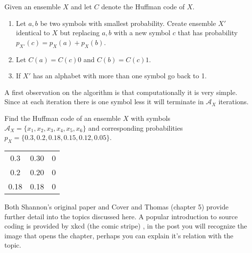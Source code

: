 Given an ensemble $X$ and let $C$ denote the Huffman code of $X$.
\begin{enumerate}
\item Let $a,b$ be two symbols with smallest probability. Create ensemble $X'$ identical to $X$ but replacing $a,b$ with a new symbol $c$ that has probability $p_{X'}(c)=p_X(a)+p_X(b)$. 
\item Let $C(a)=C(c)0$ and $C(b)=C(c)1$.
\item If $X'$ has an alphabet with more than one symbol go back to 1.
\end{enumerate}
A first observation on the algorithm is that computationally it is very simple. Since at each iteration there is one symbol less it will terminate in $\mathcal A_X$ iterations.
\begin{exercise}
Find the Huffman code of an ensemble $X$ with symbols $\mathcal A_X=\{x_1,x_2,x_3,x_4,x_5,x_6\}$ and corresponding probabilities $p_X=\{0.3,0.2,0.18,0.15,0.12,0.05\}$.
\end{exercise}
\begin{solution}

\begin{table}[h!]
  \begin{center}
    \label{tab:table1}
    \begin{tabular}{ccc} 
      0.3             &0.30&0\\
      0.2             &0.20&0\\
      0.18            &0.18                        &0
    \end{tabular}
  \end{center}
\end{table}
\end{solution}
Both Shannon's original paper \cite{Shannon_48} and Cover and Thomas \cite{Cover_91} (chapter 5) provide further detail into the topics discussed here. A popular introduction to source coding is provided by xkcd (the comic stripe) \cite{xkcd}, in the post you will recognize the image that opens the chapter, perhaps you can explain it's relation with the topic. %

